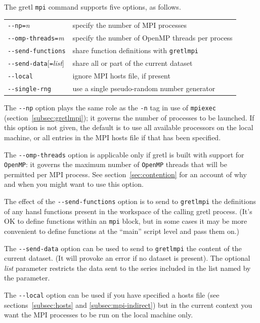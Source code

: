 \documentclass{article}
\begin{document}
The gretl \texttt{mpi} command supports five options, as follows.
\begin{center}
\begin{tabular}{ll}
\verb|--|\texttt{np=}\textsl{n} & specify the number of MPI processes\\
\verb|--|\texttt{omp-threads=}\textsl{m} & 
  specify the number of OpenMP threads per process \\
\verb|--|\texttt{send-functions} & 
  share function definitions with \texttt{gretlmpi} \\
\verb|--|\texttt{send-data}[\texttt{=}\textsl{list}] &
  share all or part of the current dataset \\
\verb|--|\texttt{local} & ignore MPI hosts file, if present \\
\verb|--|\texttt{single-rng} & 
  use a single pseudo-random number generator
\end{tabular}
\end{center}

The \verb|--np| option plays the same role as the \verb|-n| tag in use
of \texttt{mpiexec} (section~\ref{subsec:gretlmpi}); it governs
the number of processes to be launched. If this option is not given,
the default is to use all available processors on the local machine,
or all entries in the MPI hosts file if that has been specified.

The \verb|--omp-threads| option is applicable only if gretl is built
with support for \texttt{OpenMP}: it governs the maximum number of
\texttt{OpenMP} threads that will be permitted per MPI process.  See
section~\ref{sec:contention} for an account of why and when you might
want to use this option.

The effect of the \verb|--send-functions| option is to send to
\texttt{gretlmpi} the definitions of any hansl functions present
in the workspace of the calling gretl process. (It's OK to define
functions within an \texttt{mpi} block, but in some cases it may be more
convenient to define functions at the ``main'' script level and pass
them on.)

The \verb|--send-data| option can be used to send to \texttt{gretlmpi}
the content of the current dataset. (It will provoke an error if no
dataset is present). The optional \textsl{list} parameter restricts
the data sent to the series included in the list named by the
parameter.

The \verb|--local| option can be used if you have specified a hosts
file (see sections~\ref{subsec:hosts} and \ref{subsec:mpi-indirect})
but in the current context you want the MPI processes to be run on the
local machine only.
\end{document}
